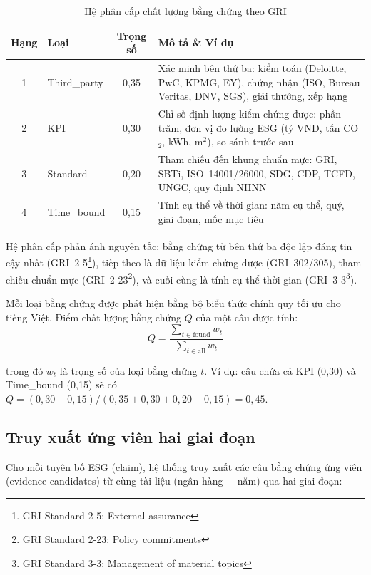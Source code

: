 \begin{table}[htbp]
\centering
\caption{Hệ phân cấp chất lượng bằng chứng theo GRI}
\label{tab:evidence_hierarchy}
\small
\renewcommand{\arraystretch}{1.3}
\begin{tabular}{|c|l|c|p{7cm}|}
\hline
\textbf{Hạng} & \textbf{Loại} & \textbf{Trọng số} & \textbf{Mô tả \& Ví dụ} \\
\hline
1 & Third\_party & 0{,}35 & Xác minh bên thứ ba: kiểm toán (Deloitte, PwC, KPMG, EY), chứng nhận (ISO, Bureau Veritas, DNV, SGS), giải thưởng, xếp hạng \\
\hline
2 & KPI & 0{,}30 & Chỉ số định lượng kiểm chứng được: phần trăm, đơn vị đo lường ESG (tỷ VND, tấn CO$_2$, kWh, m$^2$), so sánh trước-sau \\
\hline
3 & Standard & 0{,}20 & Tham chiếu đến khung chuẩn mực: GRI, SBTi, ISO~14001/26000, SDG, CDP, TCFD, UNGC, quy định NHNN \\
\hline
4 & Time\_bound & 0{,}15 & Tính cụ thể về thời gian: năm cụ thể, quý, giai đoạn, mốc mục tiêu \\
\hline
\end{tabular}
\end{table}

Hệ phân cấp phản ánh nguyên tắc: bằng chứng từ bên thứ ba độc lập đáng tin cậy nhất (GRI~2-5\footnote{GRI Standard 2-5: External assurance}), tiếp theo là dữ liệu kiểm chứng được (GRI~302/305), tham chiếu chuẩn mực (GRI~2-23\footnote{GRI Standard 2-23: Policy commitments}), và cuối cùng là tính cụ thể thời gian (GRI~3-3\footnote{GRI Standard 3-3: Management of material topics}).

Mỗi loại bằng chứng được phát hiện bằng bộ biểu thức chính quy tối ưu cho tiếng Việt. Điểm chất lượng bằng chứng $Q$ của một câu được tính:
\begin{equation}
    Q = \frac{\sum_{t \in \text{found}} w_t}{\sum_{t \in \text{all}} w_t}
    \label{eq:quality_score}
\end{equation}

\noindent trong đó $w_t$ là trọng số của loại bằng chứng $t$. Ví dụ: câu chứa cả KPI (0{,}30) và Time\_bound (0{,}15) sẽ có $Q = (0{,}30 + 0{,}15) / (0{,}35 + 0{,}30 + 0{,}20 + 0{,}15) = 0{,}45$.


\subsection{Truy xuất ứng viên hai giai đoạn}
\label{subsec:candidate_retrieval}

Cho mỗi tuyên bố ESG (claim), hệ thống truy xuất các câu bằng chứng ứng viên (evidence candidates) từ cùng tài liệu (ngân hàng + năm) qua hai giai đoạn:

